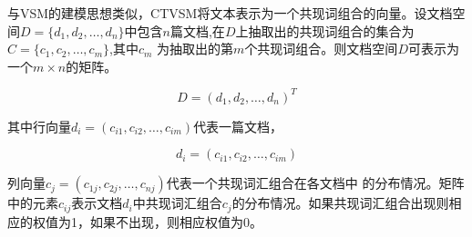 
与VSM的建模思想类似，CTVSM将文本表示为一个共现词组合的向量。设文档空间$D = \{d_1,d_2, \ldots,d_n\}$中包含$n$篇文档,在$D$上抽取出的共现词组合的集合为$C=\{c_1,c_2, \ldots,c_m \}$,其中$c_m$ 为抽取出的第$m$个共现词组合。则文档空间$D$可表示为一个$m \times n$的矩阵。

\begin{equation}
D = (d_1, d_2, \ldots, d_n)^T
\end{equation}

其中行向量$d_i=(c_{i1},c_{i2}, \ldots,c_{im} )$代表一篇文档，


\begin{equation}
d_i = (c_{i1}, c_{i2}, \ldots, c_{im})
\end{equation}

列向量$c_j = (c_{1j}, c_{2j}, \ldots,c_{nj})$代表一个共现词汇组合在各文档中 的分布情况。矩阵中的元素$c_{ij}$表示文档$d_i$中共现词汇组合$c_j$的分布情况。如果共现词汇组合出现则相应的权值为1，如果不出现，则相应权值为0。



